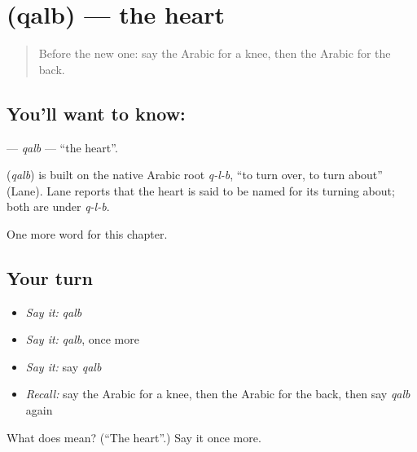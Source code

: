 \section[\texorpdfstring{\ar{قلب} (qalb)}{قلب (qalb)}]{ (qalb) — the heart}

\label{lesson:AR-C52-qalb}



\begin{quote}
Before the new one: say the Arabic for a knee, then the Arabic for the back.
\end{quote}

\subsection*{You'll want to know: }
\textbf{} — \emph{qalb} — \textquotedblleft{}the heart\textquotedblright{}.

\begin{cousinweb}
\textbf{} (\emph{qalb}) is built on the native Arabic root \emph{q-l-b}, \textquotedblleft{}to turn over, to turn about\textquotedblright{} (Lane). Lane reports that the heart is said to be named for its turning about; both are under \emph{q-l-b}.
\end{cousinweb}

\begin{grammarlens}[title={What you've built}]
One more word for this chapter.
\end{grammarlens}

\subsection*{Your turn}
\begin{itemize}
\raggedright
  \item \emph{Say it:} \emph{qalb}
  \item \emph{Say it:} \emph{qalb}, once more
  \item \emph{Say it:} say \emph{qalb}
  \item \emph{Recall:} say the Arabic for a knee, then the Arabic for the back, then say \emph{qalb} again
\end{itemize}

\begin{tcolorbox}[breakable,colback=teal!4,colframe=teal!35!black,title={Before you move on}]
What does  mean? (\textquotedblleft{}The heart\textquotedblright{}.) Say it once more.
\end{tcolorbox}
